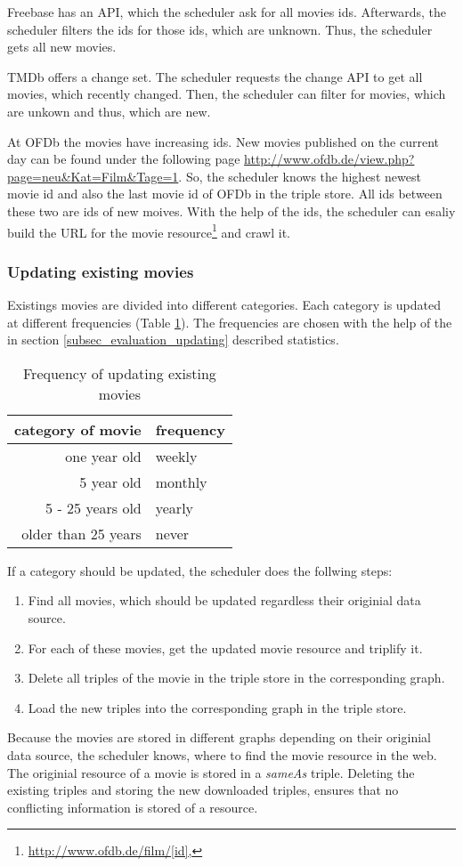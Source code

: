 Freebase has an API, which the scheduler ask for all movies ids.
Afterwards, the scheduler filters the ids for those ids, which are unknown.
Thus, the scheduler gets all new movies.

TMDb offers a change set.
The scheduler requests the change API to get all movies, which recently changed.
Then, the scheduler can filter for movies, which are unkown and thus, which are new.

At OFDb the movies have increasing ids.
New movies published on the current day can be found under the following page \url{http://www.ofdb.de/view.php?page=neu&Kat=Film&Tage=1}.
So, the scheduler knows the highest newest movie id and also the last movie id of OFDb in the triple store.
All ids between these two are ids of new moives.
With the help of the ids, the scheduler can esaliy build the URL for the movie resource\footnote{\url{http://www.ofdb.de/film/[id],}} and crawl it.

\subsubsection{Updating existing movies}
Existings movies are divided into different categories.
Each category is updated at different frequencies (Table \ref{tab_updating_existing}). The frequencies are chosen with the help of the in section \ref{subsec_evaluation_updating} described statistics.
\begin{table}[ht]
	\begin{center}
	\begin{tabular}{rl}
		\textbf{category of movie} & \textbf{frequency} \\ \hline
		one year old & weekly \\
		5 year old & monthly \\
		5 - 25 years old & yearly \\
		older than 25 years & never \\
	\end{tabular}
	\end{center}
	\caption{Frequency of updating existing movies}
	\label{tab_updating_existing}
\end{table}
If a category should be updated, the scheduler does the follwing steps:
\begin{enumerate}
	\item Find all movies, which should be updated regardless their originial data source.
	\item For each of these movies, get the updated movie resource and triplify it.
	\item Delete all triples of the movie in the triple store in the corresponding graph.
	\item Load the new triples into the corresponding graph in the triple store.
\end{enumerate}
Because the movies are stored in different graphs depending on their originial data source, the scheduler knows, where to find the movie resource in the web.
The originial resource of a movie is stored in a \emph{sameAs} triple.
Deleting the existing triples and storing the new downloaded triples, ensures that no conflicting information is stored of a resource.